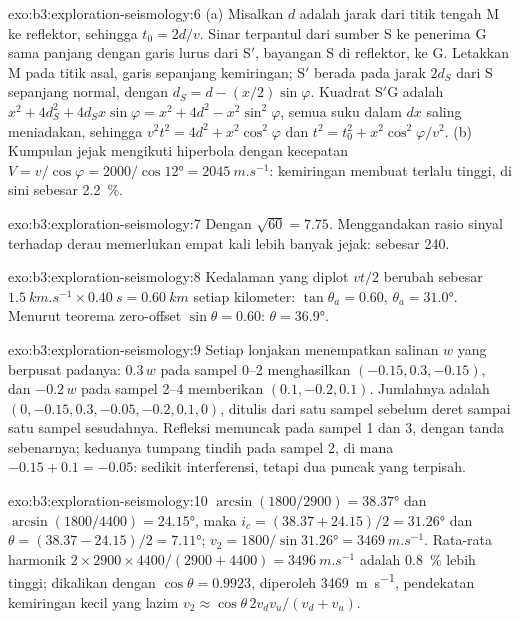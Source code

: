 \begin{solution}{exo:b3:exploration-seismology:6}
(a) Misalkan $d$ adalah jarak dari titik tengah M ke reflektor, sehingga
$t_0 = 2d/v$. Sinar terpantul dari sumber S ke penerima G sama panjang
dengan garis lurus dari S$'$, bayangan S di reflektor, ke G. Letakkan M pada
titik asal, garis sepanjang kemiringan; S$'$ berada pada jarak $2d_S$ dari S sepanjang
normal, dengan $d_S = d - (x/2)\sin\varphi$. Kuadrat S$'$G adalah
$x^2 + 4d_S^2 + 4d_Sx\sin\varphi = x^2 + 4d^2 - x^2\sin^2\varphi$, semua suku
dalam $dx$ saling meniadakan, sehingga $v^2t^2 = 4d^2 + x^2\cos^2\varphi$ dan
$t^2 = t_0^2 + x^2\cos^2\varphi/v^2$. (b) Kumpulan jejak mengikuti hiperbola dengan kecepatan
$V = v/\cos\varphi = 2000/\cos\ang{12} = \qty{2045}{m.s^{-1}}$: kemiringan membuat
 terlalu tinggi, di sini sebesar \qty{2.2}{\percent}.
\end{solution}

\begin{solution}{exo:b3:exploration-seismology:7}
Dengan $\sqrt{60} = 7.75$. Menggandakan rasio sinyal terhadap derau memerlukan
empat kali lebih banyak jejak:  sebesar 240.
\end{solution}

\begin{solution}{exo:b3:exploration-seismology:8}
Kedalaman yang diplot $vt/2$ berubah sebesar $\qty{1.5}{km.s^{-1}}\times\qty{0.40}{s}
= \qty{0.60}{km}$ setiap kilometer: $\tan\theta_a = 0.60$, $\theta_a = \ang{31.0}$.
Menurut teorema zero-offset $\sin\theta = 0.60$: $\theta = \ang{36.9}$.
\end{solution}

\begin{solution}{exo:b3:exploration-seismology:9}
Setiap lonjakan menempatkan salinan $w$ yang berpusat padanya: $0.3\,w$ pada sampel 0--2 menghasilkan
$(-0.15, 0.3, -0.15)$, dan $-0.2\,w$ pada sampel 2--4 memberikan $(0.1, -0.2, 0.1)$.
Jumlahnya adalah $(0, -0.15, 0.3, -0.05, -0.2, 0.1, 0)$, ditulis dari satu sampel
sebelum deret sampai satu sampel sesudahnya. Refleksi memuncak pada sampel 1 dan 3, dengan
tanda sebenarnya; keduanya tumpang tindih pada sampel 2, di mana $-0.15 + 0.1 = -0.05$: sedikit
interferensi, tetapi dua puncak yang terpisah.
\end{solution}

\begin{solution}{exo:b3:exploration-seismology:10}
$\arcsin(1800/2900) = \ang{38.37}$ dan $\arcsin(1800/4400) = \ang{24.15}$, maka
$i_c = (38.37 + 24.15)/2 = \ang{31.26}$ dan $\theta = (38.37 - 24.15)/2 =
\ang{7.11}$; $v_2 = 1800/\sin\ang{31.26} = \qty{3469}{m.s^{-1}}$. Rata-rata
harmonik $2\times2900\times4400/(2900 + 4400) = \qty{3496}{m.s^{-1}}$ adalah
\qty{0.8}{\percent} lebih tinggi; dikalikan dengan $\cos\theta = 0.9923$, diperoleh
\qty{3469}{m.s^{-1}}, pendekatan kemiringan kecil yang lazim
$v_2 \approx \cos\theta\,2v_dv_u/(v_d + v_u)$.
\end{solution}

